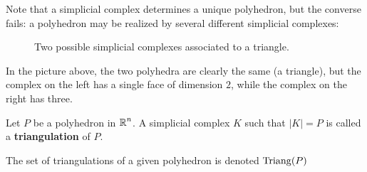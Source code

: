 Note that a simplicial complex determines a unique polyhedron, but the converse fails: a polyhedron may be realized by several different simplicial complexes:
\begin{figure}[H]
    \centering

\caption{Two possible simplicial complexes associated to a triangle.}
\end{figure}
In the picture above, the two polyhedra are clearly the same (a triangle), but the complex on the left has a single face of dimension $2$, while the complex on the right has three.
\begin{definition}[Triangulation]
    Let $P$ be a polyhedron in $\operatorname{\mathbb{R}}^n$. A simplicial complex $K$ such that $|K|=P$ is called a \textbf{triangulation} of $P$.

    The set of triangulations of a given polyhedron is denoted $\operatorname{Triang}(P)$
\end{definition}

